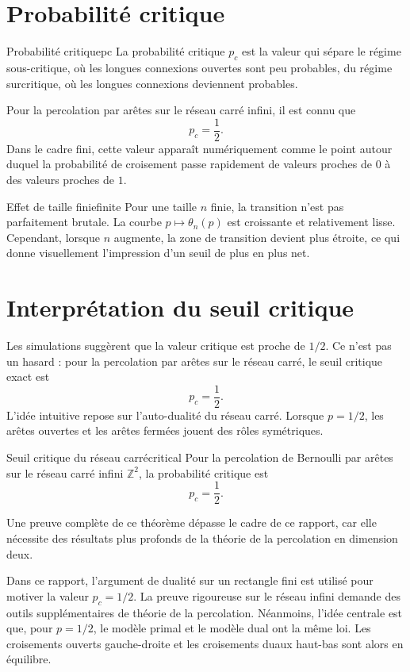 \documentclass[11pt,a4paper]{report}
\newenvironment{proofbox}
{\begin{tcolorbox}[colback=grisclair,colframe=black!25,title=\textbf{Démonstration},fonttitle=\bfseries,sharp corners,boxrule=0.6pt]}
{\end{tcolorbox}}
\newcommand{\Z}{\mathbb{Z}}
\begin{document}
\section{Probabilité critique}

\begin{definitionbox}{Probabilité critique}{pc}
La probabilité critique $p_c$ est la valeur qui sépare le régime sous-critique, où les longues connexions ouvertes sont peu probables, du régime surcritique, où les longues connexions deviennent probables.
\end{definitionbox}

Pour la percolation par arêtes sur le réseau carré infini, il est connu que
\[
p_c=\frac12.
\]
Dans le cadre fini, cette valeur apparaît numériquement comme le point autour duquel la probabilité de croisement passe rapidement de valeurs proches de $0$ à des valeurs proches de $1$.

\begin{remarkbox}{Effet de taille finie}{finite}
Pour une taille $n$ finie, la transition n'est pas parfaitement brutale. La courbe $p\mapsto\theta_n(p)$ est croissante et relativement lisse. Cependant, lorsque $n$ augmente, la zone de transition devient plus étroite, ce qui donne visuellement l'impression d'un seuil de plus en plus net.
\end{remarkbox}

\section{Interprétation du seuil critique}

Les simulations suggèrent que la valeur critique est proche de $1/2$. Ce n'est pas un hasard : pour la percolation par arêtes sur le réseau carré, le seuil critique exact est
\[
p_c=\frac12.
\]
L'idée intuitive repose sur l'auto-dualité du réseau carré. Lorsque $p=1/2$, les arêtes ouvertes et les arêtes fermées jouent des rôles symétriques.

\begin{theorembox}{Seuil critique du réseau carré}{critical}
Pour la percolation de Bernoulli par arêtes sur le réseau carré infini $\Z^2$, la probabilité critique est
\[
p_c=\frac12.
\]
\end{theorembox}

\begin{proofbox}
Une preuve complète de ce théorème dépasse le cadre de ce rapport, car elle nécessite des résultats plus profonds de la théorie de la percolation en dimension deux.

Dans ce rapport, l'argument de dualité sur un rectangle fini est utilisé pour motiver la valeur $p_c=1/2$. La preuve rigoureuse sur le réseau infini demande des outils supplémentaires de théorie de la percolation. Néanmoins, l'idée centrale est que, pour $p=1/2$, le modèle primal et le modèle dual ont la même loi. Les croisements ouverts gauche-droite et les croisements duaux haut-bas sont alors en équilibre.
\end{proofbox}
\end{document}
